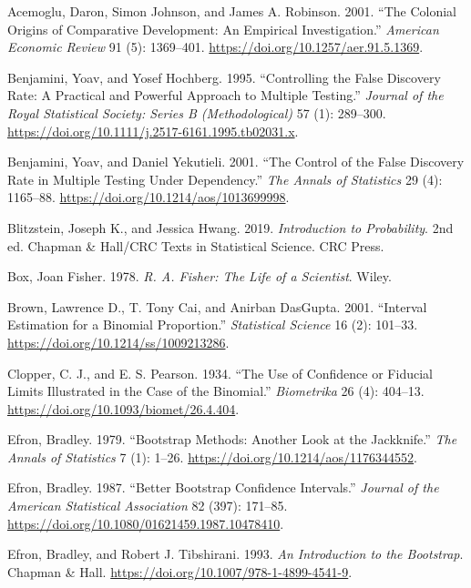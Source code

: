 \documentclass[
  13pt,
  letterpaper,
  DIV=11,
  numbers=noendperiod]{scrreprt}
\newlength{\cslhangindent}
\newenvironment{CSLReferences}[2] %
 {\begin{list}{}{%
  \setlength{\itemindent}{0pt}
  \setlength{\leftmargin}{0pt}
  \setlength{\parsep}{0pt}
  \ifodd #1
   \setlength{\leftmargin}{\cslhangindent}
   \setlength{\itemindent}{-1\cslhangindent}
  \fi
  \setlength{\itemsep}{#2\baselineskip}}}
 {\end{list}}
\theoremstyle{plain}
\theoremstyle{plain}
\theoremstyle{definition}
\theoremstyle{definition}
\theoremstyle{remark}
\begin{document}
\protect{}\label{refs}
\begin{CSLReferences}{1}{1}
Acemoglu, Daron, Simon Johnson, and James A. Robinson. 2001. {``The
Colonial Origins of Comparative Development: An Empirical
Investigation.''} \emph{American Economic Review} 91 (5): 1369--401.
\url{https://doi.org/10.1257/aer.91.5.1369}.

Benjamini, Yoav, and Yosef Hochberg. 1995. {``Controlling the False
Discovery Rate: A Practical and Powerful Approach to Multiple
Testing.''} \emph{Journal of the Royal Statistical Society: Series B
(Methodological)} 57 (1): 289--300.
\url{https://doi.org/10.1111/j.2517-6161.1995.tb02031.x}.

Benjamini, Yoav, and Daniel Yekutieli. 2001. {``The Control of the False
Discovery Rate in Multiple Testing Under Dependency.''} \emph{The Annals
of Statistics} 29 (4): 1165--88.
\url{https://doi.org/10.1214/aos/1013699998}.

Blitzstein, Joseph K., and Jessica Hwang. 2019. \emph{Introduction to
Probability}. 2nd ed. Chapman \& Hall/CRC Texts in Statistical Science.
CRC Press.

Box, Joan Fisher. 1978. \emph{R. A. Fisher: The Life of a Scientist}.
Wiley.

Brown, Lawrence D., T. Tony Cai, and Anirban DasGupta. 2001. {``Interval
Estimation for a Binomial Proportion.''} \emph{Statistical Science} 16
(2): 101--33. \url{https://doi.org/10.1214/ss/1009213286}.

Clopper, C. J., and E. S. Pearson. 1934. {``The Use of Confidence or
Fiducial Limits Illustrated in the Case of the Binomial.''}
\emph{Biometrika} 26 (4): 404--13.
\url{https://doi.org/10.1093/biomet/26.4.404}.

Efron, Bradley. 1979. {``Bootstrap Methods: Another Look at the
Jackknife.''} \emph{The Annals of Statistics} 7 (1): 1--26.
\url{https://doi.org/10.1214/aos/1176344552}.

Efron, Bradley. 1987. {``Better Bootstrap Confidence Intervals.''}
\emph{Journal of the American Statistical Association} 82 (397):
171--85. \url{https://doi.org/10.1080/01621459.1987.10478410}.

Efron, Bradley, and Robert J. Tibshirani. 1993. \emph{An Introduction to
the Bootstrap}. Chapman \& Hall.
\url{https://doi.org/10.1007/978-1-4899-4541-9}.


\end{CSLReferences}
\end{document}
